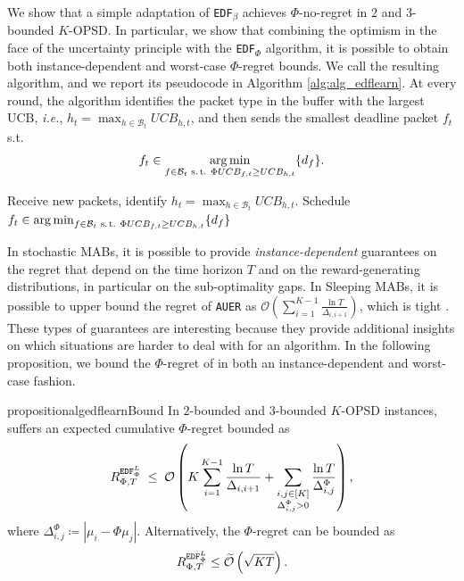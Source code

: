 We show that a simple adaptation of \texttt{EDF}$_\beta$ achieves $\Phi$-no-regret in $2$ and $3$-bounded $K$-OPSD.
In particular, we show that combining the optimism in the face of the uncertainty principle with the \texttt{EDF}$_\Phi$ algorithm, it is possible to obtain both instance-dependent and worst-case $\Phi$-regret bounds. We call \algedflearn the resulting algorithm, and we report its pseudocode in Algorithm \ref{alg:alg_edflearn}. At every round, the algorithm identifies the packet type in the buffer with the largest UCB, \emph{i.e.}, $h_t = \max_{h \in \mathcal{B}_t} UCB_{h,t}$, and then sends the smallest deadline packet $f_t$ s.t. 
$$
 f_t \in \operatorname*{arg\,min}_{f \in \mathcal{B}_t \text{ s.\,t.}\ \Phi UCB_{f,t} \ge UCB_{h,t}} \{d_f\}.
$$
\begin{algorithm}[!t]
\caption{\algedflearn}
\label{alg:alg_edflearn}
\small
\begin{algorithmic}[1]
        \STATE Receive new packets, identify $h_t = \max_{h \in \mathcal{B}_t} UCB_{h,t}$.
        \STATE Schedule $f_t \in \operatorname*{arg\,min}_{f \in \mathcal{B}_t \text{ s.\,t.}\ \Phi UCB_{f,t} \ge UCB_{h,t}} \{d_f\} $
    \ENDFOR
\end{algorithmic}
\end{algorithm}
In stochastic MABs, it is possible to provide \textit{instance-dependent} guarantees on the regret that depend on the time horizon $T$ and on the reward-generating distributions, in particular on the sub-optimality gaps. In Sleeping MABs, it is possible to upper bound the regret of \texttt{AUER} as $\mathcal{O}\left(\sum_{i=1}^{K-1} \frac{\ln T}{\Delta_{i,i+1}}\right)$, which is tight \cite{kleinberg2010regret}. These types of guarantees are interesting because they provide additional insights on which situations are harder to deal with for an algorithm.
In the following proposition, we bound the $\Phi$-regret of \algedflearn in both an instance-dependent and worst-case fashion. 
\begin{restatable}{proposition}{algedflearnBound}
\label{prop:reduction}
    In $2$-bounded and $3$-bounded $K$-OPSD instances, \algedflearn suffers an expected cumulative $\Phi$-regret bounded as 
    \begin{align*}
    R_{\Phi,T}^{\text{\algedflearn}}
    \;\le\;
    \mathcal{O}\left(K\sum_{i =1}^{K - 1} \frac{\ln T}{\Delta_{i, i+1}} + \sum_{\substack{i,j \in [K]\\ \Delta_{i,j}^\Phi > 0}} \frac{\ln T}{\Delta_{i,j}^\Phi}\right),
\end{align*}
    where $\Delta_{i,j}^{\Phi} \coloneqq |\mu_i-\Phi\mu_j|$.
    Alternatively, the $\Phi$-regret can be bounded as
    \begin{align*}
        R_{\Phi,T}^{\text{\algedflearn}} \le \widetilde{\mathcal{O}}\left(\sqrt{KT}\right).
    \end{align*}
\end{restatable}
